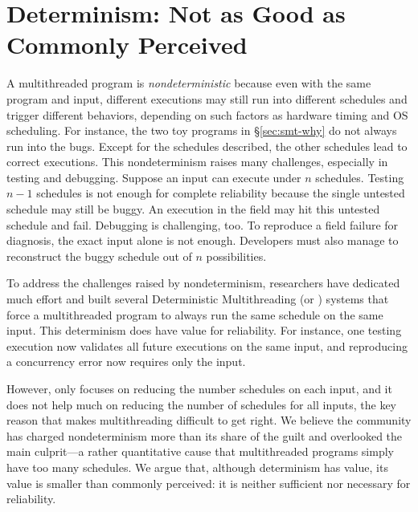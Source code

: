 


\section{Determinism: Not as Good as Commonly Perceived} \label{sec:smt-dmt}

A multithreaded program is \emph{nondeterministic} because even with the same
program and input, different executions may still run into different schedules
and trigger different behaviors, depending on such factors as hardware timing
and OS scheduling. For instance, the two toy programs in \S\ref{sec:smt-why}
do not always run into the bugs.  Except for the schedules described, the
other schedules lead to correct executions. This nondeterminism raises many
challenges, especially in testing and debugging.  Suppose an input can execute
under $n$ schedules. Testing $n-1$ schedules is not enough for complete
reliability because the single untested schedule may still be buggy.  An
execution in the field may hit this untested schedule and fail.  Debugging is
challenging, too. To reproduce a field failure for diagnosis, the exact input
alone is not enough. Developers must also manage to reconstruct the buggy
schedule out of $n$ possibilities.

To address the challenges raised by nondeterminism, researchers have dedicated
much effort and built several Deterministic Multithreading (or \dmt) systems
that force a multithreaded program to always run the same schedule on the same
input.  This determinism does have value for reliability.  For instance, one
testing execution now validates all future executions on the same input, and 
reproducing a concurrency error now requires only the input.

However, \dmt only focuses on reducing the number schedules on each input, and
it does not help much on reducing the number of schedules for all inputs, the
key reason that makes multithreading difficult to get right.  We believe the
community has charged nondeterminism more
than its share of the guilt and overlooked the main culprit---a rather
quantitative cause that multithreaded programs simply have too many schedules.
We argue that, although determinism has value, its value is smaller than
commonly perceived: it is neither sufficient nor necessary for reliability.

